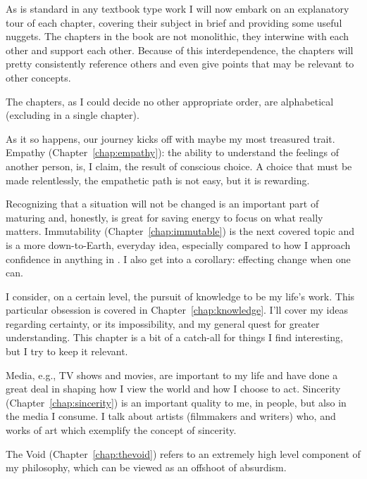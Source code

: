 \documentclass[./butidigress.tex]{subfiles}
\begin{document}
\label{sec:chapterrundown}
As is standard in any textbook type work I will now embark on an explanatory tour of each chapter, covering their subject in brief and providing some useful nuggets.
The chapters in the book are not monolithic, they interwine with each other and support each other.
Because of this interdependence, the chapters will pretty consistently reference others and even give points that may be relevant to other concepts.

The chapters, as I could decide no other appropriate order, are alphabetical (excluding  in a single chapter).

As it so happens, our journey kicks off with maybe my most treasured trait.
Empathy (Chapter~\ref{chap:empathy}): the ability to understand the feelings of another person, is, I claim, the result of conscious choice.
A choice that must be made relentlessly, the empathetic path is not easy, but it is rewarding.

Recognizing that a situation will not be changed is an important part of maturing and, honestly, is great for saving energy to focus on what really matters.
Immutability (Chapter~\ref{chap:immutable}) is the next covered topic and is a more down-to-Earth, everyday idea, especially compared to how I approach confidence in anything in .
I also get into a corollary: effecting change when one can.

I consider, on a certain level, the pursuit of knowledge to be my life's work.
This particular obsession is covered in Chapter~\ref{chap:knowledge}.
I'll cover my ideas regarding certainty, or its impossibility, and my general quest for greater understanding.
This chapter is a bit of a catch-all for things I find interesting, but I try to keep it relevant.

Media, e.g., TV shows and movies, are important to my life and have done a great deal in shaping how I view the world and how I choose to act.
Sincerity (Chapter~\ref{chap:sincerity}) is an important quality to me, in people, but also in the media I consume.
I talk about artists (filmmakers and writers) who, and works of art which exemplify the concept of sincerity.

The Void (Chapter~\ref{chap:thevoid}) refers to an extremely high level component of my philosophy, which can be viewed as an offshoot of absurdism.
\end{document}

